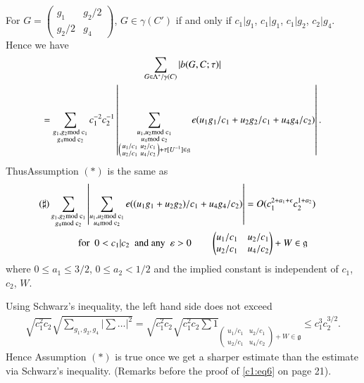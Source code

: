 For $G=\left(\begin{smallmatrix} g_{1} & g_{2}/2\\ g_{2}/2 & g_{4}
\end{smallmatrix}\right)$, $G\in\gamma(C')$ if and only if
$c_{1}|g_{1}$, $c_{1}|g_{1}$, $c_{1}|g_{2}$, $c_{2}|g_{4}$. Hence we
have
{\fontsize{10}{12}\selectfont
\begin{gather*}
 \sum_{G\in\Lambda^{\ast}/\gamma(C)}|b(G,C;\tau)|\\
=\sum_{\substack{g_{1},g_{2}\rm{mod} \; c_{1}\\ g_{4}\rm{mod} \;
    c_{2}}}c^{-2}_{1}c^{-1}_{2} \left| \sum_{\substack{u_{1},u_{2}\rm{mod} \;
    c_{1}\\ u_{4}\rm{mod} \; c_{2}\\ \left(\begin{smallmatrix} u_{1}/c_{1} &
      u_{2}/c_{1}\\ u_{2}/c_{1} & u_{4}/c_{2}
    \end{smallmatrix}\right)+\tau[U^{-1}]\in\mathfrak{g}}}e(u_{1}g_{1}/c_{1}+u_{2}g_{2}/c_{1}+u_{4}g_{4}/c_{2})
\right|. 
\end{gather*}}
Thus\pageoriginale Assumption $(\ast)$ is the same as
{\fontsize{10}{12}\selectfont
\begin{align*}
& (\sharp)\sum_{\substack{g_{1},g_{2}\rm{mod} \; c_{1}\\ g_{4}\rm{mod} \;
    c_{2}}}\left| \sum_{\substack{u_{1},u_{2}\rm{mod} \; c_{1}\\ u_{4}\rm{mod} \;
    c_{2}}} e((u_{1}g_{1}+u_{2}g_{2})/ c_{1}+u_{4} g_{4} / c_{2})\right| =
O(c^{2+a_{1}+\epsilon}_{1}c^{1+a_{2}}_{2})\\ 
& \qquad \qquad \text{for \ } 0<c_{1}|c_{2}\text{ \ and any \ }
\varepsilon>0 \qquad  
 \begin{pmatrix} u_{1}/c_{1} &
      u_{2}/c_{1}\\ u_{2}/c_{1} & u_{4}/c_{2}
    \end{pmatrix} + W \in \mathfrak{g}\qquad 
\end{align*}}
where $0\leq a_{1}\leq 3/2$, $0\leq a_{2}<1/2$ and the implied
constant is independent of $c_{1}$, $c_{2}$, $W$.

Using Schwarz's inequality, the left hand side does not exceed
{\fontsize{10}{12}\selectfont
\begin{align*}
\sqrt{c^{2}_{1}c_{2}}\sqrt{\sum_{g_{1},g_{2},g_{4}}|\sum\ldots|^{2}}=\sqrt{c^{2}_{1}c_{2}}\sqrt{c^{2}_{1}c_{2}\sum
  1}_{\left(\begin{smallmatrix} u_{1}/c_{1} &
    u_{2}/c_{1}\\ u_{2}/c_{1} & u_{4}/c_{2}
  \end{smallmatrix}\right)+W\in\mathfrak{g}}\leq c^{3}_{1}c^{3/2}_{2}.
\end{align*}}\relax
Hence Assumption $(\ast)$ is true once we get a sharper estimate than
the estimate via Schwarz's inequality. (\cf Remarks before the proof
of \eqref{c1:eq6} on page 21).

